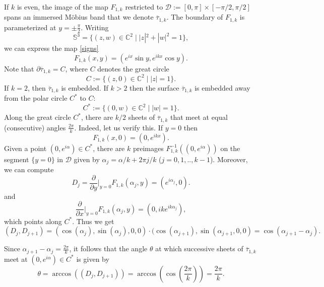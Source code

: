 \documentclass[11pt, reqno]{amsart}
\numberwithin{equation}{section}
\begin{document}
If $k$ is even, the image of the map $F_{1,k}$ restricted to $\mathcal{D}:=[0,\pi]\times [-\pi/2,\pi/2]$ spans an immersed M\"obius band that we denote $\overline{\tau}_{1,k}$. The boundary of $F_{1,k}$ is parameterized at $y=\pm\frac{\pi}{2}$. 
Writing
\begin{equation}
\mathbb{S}^3=\{(z,w)\in\mathbb{C}^2\;|\; |z|^2+|w|^2=1\}, 
\end{equation}
we can express the map \eqref{signs}
\begin{equation}\label{param}
F_{1,k}(x,y)= (e^{ix}\sin y,e^{ikx}\cos y).
\end{equation}
Note that $\partial\overline{\tau}_{1,k}=C$, where $C$ denotes the great circle 
\begin{equation}C:=\{(z,0)\in\mathbb{C}^2\;|\; |z|=1\}.\end{equation}
If $k=2$, then $\overline{\tau}_{1,k}$ is embedded.  If $k>2$ then the surface $\overline{\tau}_{1,k}$ is embedded away from the polar circle $C^*$ to $C$:
\begin{equation}C^*:=\{(0,w)\in\mathbb{C}^2\;|\; |w|=1\}.\end{equation}
Along the great circle $C^*$, there are $k/2$ sheets of $\overline{\tau}_{1,k}$ that meet at equal (consecutive) angles $\frac{2\pi}{k}$.  Indeed, let us verify this.  If $y=0$ then 
\begin{equation}
F_{1,k}(x,0) = (0,e^{ikx}).
\end{equation}
Given a point $(0,e^{i\alpha})\in C^*$, there are $k$ preimages $F_{1,k}^{-1}((0,e^{i\alpha}))$ on the segment $\{y=0\}$ in $\mathcal{D}$ given by  $\alpha_j =\alpha/k + 2\pi j/k$ ($j=0,1,..,k-1$).
Moreover, we can compute
\begin{equation}
D_j=\frac{\partial}{\partial y}\Big|_{y=0}F_{1,k}(\alpha_j,y)=(e^{i\alpha_j},0).
\end{equation}
and 
\begin{equation}
\frac{\partial}{\partial x}\Big|_{y=0}F_{1,k}(\alpha_j,y)=(0,ike^{ik\alpha_j}), 
\end{equation}
which points along $C^*$.  Thus we get
\begin{equation}
( D_j, D_{j+1}) =(\cos( \alpha_j), \sin(\alpha_j),0,0)\cdot (\cos(\alpha_{j+1}),\sin(\alpha_{j+1},0,0) = \cos(\alpha_{j+1}-\alpha_j).
\end{equation}

Since $\alpha_{j+1}-\alpha_j=\frac{2\pi}{k}$, it follows that the angle $\theta$ at which successive sheets of $\overline{\tau}_{1,k}$ meet at $(0,e^{i\alpha})\in C^*$ is given by 
\begin{equation}
\theta = \arccos((D_j, D_{j+1})) = \arccos (\cos(\frac{2\pi}{k})) = \frac{2\pi}{k}.
\end{equation}
\end{document}
